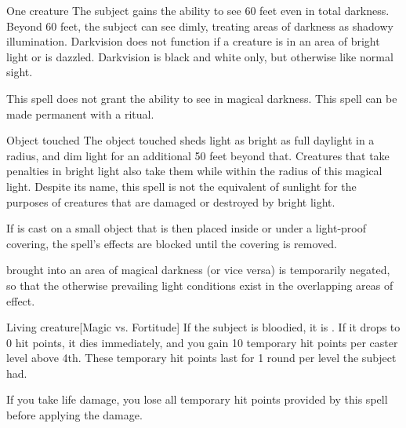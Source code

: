 \spellrng{\rngtouch}
\spelldur{\durlong}
\begin{spelltarget}{One creature}
    \spelleffect The subject gains the ability to see 60 feet even in total darkness. Beyond 60 feet, the subject can see dimly, treating areas of darkness as shadowy illumination. Darkvision does not function if a creature is in an area of bright light or is dazzled. Darkvision is black and white only, but otherwise like normal sight.
\end{spelltarget}
\spellnotes This spell does not grant the ability to see in magical darkness. This spell can be made permanent with a  ritual.

\spellrng{\rngtouch}
\spelldur{\durlong \dismissable}
\begin{spelltarget}{Object touched}
    \spelleffect The object touched sheds light as bright as full daylight in a \arealarge radius, and dim light for an additional 50 feet beyond that. Creatures that take penalties in bright light also take them while within the radius of this magical light. Despite its name, this spell is not the equivalent of sunlight for the purposes of creatures that are damaged or destroyed by bright light.
    \par If  is cast on a small object that is then placed inside or under a light-proof covering, the spell's effects are blocked until the covering is removed.
\end{spelltarget}
\spellnotes {} brought into an area of magical darkness (or vice versa) is temporarily negated, so that the otherwise prevailing light conditions exist in the overlapping areas of effect.

\spellrng{\rngmed}
\begin{spelltarget}{Living creature}[Magic vs. Fortitude]
    \spellsuccess If the subject is bloodied, it is \vulnerable. If it drops to 0 hit points, it dies immediately, and you gain 10 temporary hit points  per caster level above 4th. These temporary hit points last for 1 round per level the subject had.
\end{spelltarget}
\spellnotes If you take life damage, you lose all temporary hit points provided by this spell before applying the damage.

